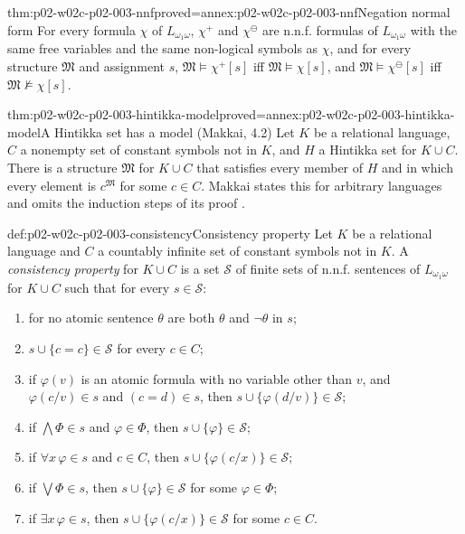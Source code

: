 \begin{hblemma}{thm:p02-w02c-p02-003-nnf}{proved=annex:p02-w02c-p02-003-nnf}{Negation normal form}
For every formula \(\chi\) of \(L_{\omega_1\omega}\), \(\chi^{+}\) and
\(\chi^{\ominus}\) are n.n.f. formulas of \(L_{\omega_1\omega}\) with the
same free variables and the same non-logical symbols as \(\chi\), and for
every structure \(\mathfrak M\) and assignment \(s\),
\(\mathfrak M\models\chi^{+}[s]\) iff \(\mathfrak M\models\chi[s]\), and
\(\mathfrak M\models\chi^{\ominus}[s]\) iff
\(\mathfrak M\not\models\chi[s]\).
\end{hblemma}

\begin{hblemma}{thm:p02-w02c-p02-003-hintikka-model}{proved=annex:p02-w02c-p02-003-hintikka-model}{A Hintikka set has a model (Makkai, 4.2)}
Let \(K\) be a relational language, \(C\) a nonempty set of constant
symbols not in \(K\), and \(H\) a Hintikka set for \(K\cup C\).  There is a
structure \(\mathfrak M\) for \(K\cup C\) that satisfies every member of
\(H\) and in which every element is \(c^{\mathfrak M}\) for some \(c\in C\).
Makkai states this for arbitrary languages and omits the induction steps of
its proof \cite[ch.~A.7, \S4, 4.2, p.~250]{Makkai1977}.
\end{hblemma}

\begin{hbdefinition}{def:p02-w02c-p02-003-consistency}{Consistency property}
Let \(K\) be a relational language and \(C\) a countably infinite set of
constant symbols not in \(K\).  A \emph{consistency property} for
\(K\cup C\) is a set \(\mathcal S\) of finite sets of n.n.f. sentences of
\(L_{\omega_1\omega}\) for \(K\cup C\) such that for every
\(s\in\mathcal S\):
\begin{enumerate}
\item[(C0)] for no atomic sentence \(\theta\) are both \(\theta\) and
      \(\neg\theta\) in \(s\);
\item[(C1)] \(s\cup\{c=c\}\in\mathcal S\) for every \(c\in C\);
\item[(C2)] if \(\varphi(v)\) is an atomic formula with no variable other
      than \(v\), and \(\varphi(c/v)\in s\) and \((c=d)\in s\), then
      \(s\cup\{\varphi(d/v)\}\in\mathcal S\);
\item[(C3)] if \(\bigwedge\Phi\in s\) and \(\varphi\in\Phi\), then
      \(s\cup\{\varphi\}\in\mathcal S\);
\item[(C4)] if \(\forall x\,\varphi\in s\) and \(c\in C\), then
      \(s\cup\{\varphi(c/x)\}\in\mathcal S\);
\item[(C5)] if \(\bigvee\Phi\in s\), then
      \(s\cup\{\varphi\}\in\mathcal S\) for some \(\varphi\in\Phi\);
\item[(C6)] if \(\exists x\,\varphi\in s\), then
      \(s\cup\{\varphi(c/x)\}\in\mathcal S\) for some \(c\in C\).
\end{enumerate}
\end{hbdefinition}

